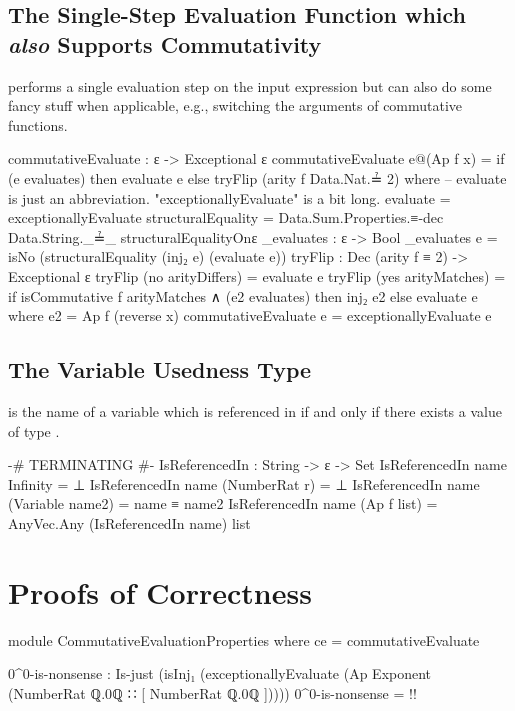 \documentclass{report}
\begin{document}
\section{The Single-Step Evaluation Function which \emph{also} Supports Commutativity}
  performs a single evaluation step on the input expression but can also do some fancy stuff when applicable, e.g., switching the arguments of commutative functions.

\begin{code}
commutativeEvaluate : ε -> Exceptional ε
commutativeEvaluate e@(Ap f x) =
  if (e evaluates) then evaluate e else tryFlip (arity f Data.Nat.≟ 2)
  where
  -- evaluate is just an abbreviation.  "exceptionallyEvaluate" is a bit long.
  evaluate = exceptionallyEvaluate
  structuralEquality =
    Data.Sum.Properties.≡-dec Data.String._≟_ structuralEqualityOnε
  _evaluates : ε -> Bool
  _evaluates e = isNo (structuralEquality (inj₂ e) (evaluate e))
  tryFlip : Dec (arity f ≡ 2) -> Exceptional ε
  tryFlip (no arityDiffers) = evaluate e
  tryFlip (yes arityMatches) =
    if isCommutative f arityMatches ∧ (e2 evaluates) then inj₂ e2 else evaluate e
    where e2 = Ap f (reverse x)
commutativeEvaluate e = exceptionallyEvaluate e
\end{code}

\section{The Variable Usedness Type}
 is the name of a variable which is referenced in  if and only if there exists a value of type   .

\begin{code}
{-# TERMINATING #-}
IsReferencedIn : String -> ε -> Set
IsReferencedIn name Infinity = ⊥
IsReferencedIn name (NumberRat r) = ⊥
IsReferencedIn name (Variable name2) = name ≡ name2
IsReferencedIn name (Ap f list) = AnyVec.Any (IsReferencedIn name) list
\end{code}

\chapter{Proofs of Correctness}

\begin{code}
module CommutativeEvaluationProperties where
  ce = commutativeEvaluate

  0^0-is-nonsense :
    Is-just (isInj₁ (exceptionallyEvaluate
      (Ap Exponent (NumberRat ℚ.0ℚ ∷ [ NumberRat ℚ.0ℚ ]))))
  0^0-is-nonsense = {!!}
\end{code}
\end{document}
